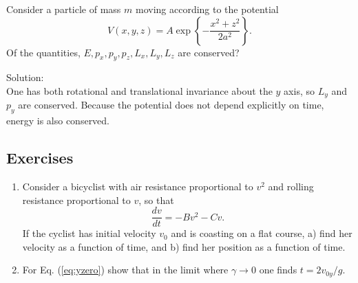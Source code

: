 \example
Consider a particle of mass $m$ moving according to the potential
\[
V(x,y,z)=A\exp\left\{-\frac{x^2+z^2}{2a^2}\right\}.
\]
Of the quantities, $E,p_x,p_y,p_z,L_x,L_y,L_z$ are conserved?

Solution:\\
One has both rotational and translational invariance about the $y$ axis, so $L_y$ and $p_y$ are conserved. Because the potential does not depend explicitly on time, energy is also conserved. 

\exampleend


\subsection{Exercises}

\begin{enumerate}
\item Consider a bicyclist with air resistance proportional to $v^2$ and rolling resistance proportional to $v$, so that
\[
\frac{dv}{dt}=-Bv^2-Cv.
\]
If the cyclist has initial velocity $v_0$ and is coasting on a flat course, a) find her velocity as a function of time, and b) find her position as a function of time.
\item For Eq. (\ref{eq:yzero}) show that in the limit where $\gamma\rightarrow 0$ one finds $t=2v_{0y}/g$.


\end{enumerate}

